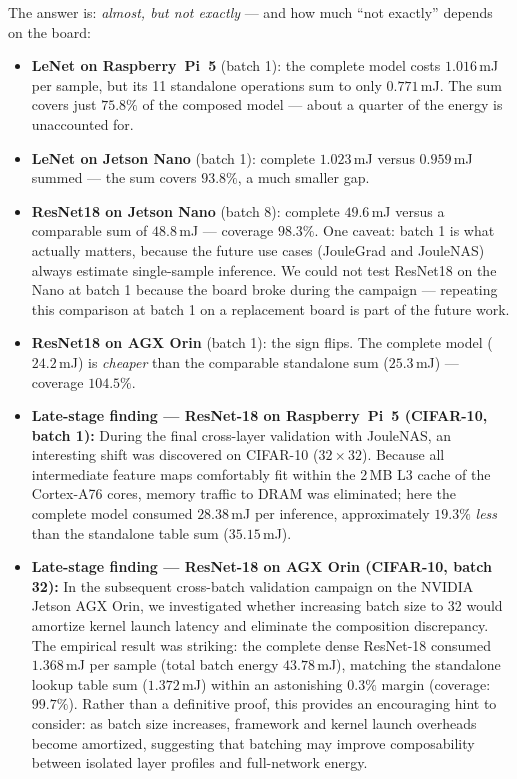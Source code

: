 The answer is: \emph{almost, but not exactly} --- and how much ``not
exactly'' depends on the board:

\begin{itemize}
    \item \textbf{LeNet on Raspberry~Pi~5} (batch 1): the complete model
    costs $1.016$\,mJ per sample, but its 11 standalone operations sum to
    only $0.771$\,mJ. The sum covers just $75.8\%$ of the composed model ---
    about a quarter of the energy is unaccounted for.
    \item \textbf{LeNet on Jetson Nano} (batch 1): complete $1.023$\,mJ
    versus $0.959$\,mJ summed --- the sum covers $93.8\%$, a much smaller
    gap.
    \item \textbf{ResNet18 on Jetson Nano} (batch 8): complete
    $49.6$\,mJ versus a comparable sum of $48.8$\,mJ --- coverage $98.3\%$.
    One caveat: batch 1 is what actually matters, because the future use
    cases (JouleGrad and JouleNAS) always estimate single-sample inference.
    We could not test ResNet18 on the Nano at batch 1 because the board
    broke during the campaign --- repeating this comparison at batch 1 on a
    replacement board is part of the future work.
    \item \textbf{ResNet18 on AGX Orin} (batch 1): the sign flips. The
    complete model ($24.2$\,mJ) is \emph{cheaper} than the comparable
    standalone sum ($25.3$\,mJ) --- coverage $104.5\%$.
    \item \textbf{Late-stage finding --- ResNet-18 on Raspberry~Pi~5 (CIFAR-10, batch 1):} During the final cross-layer validation with JouleNAS, an interesting shift was discovered on CIFAR-10 ($32 \times 32$). Because all intermediate feature maps comfortably fit within the 2\,MB L3 cache of the Cortex-A76 cores, memory traffic to DRAM was eliminated; here the complete model consumed $28.38$\,mJ per inference, approximately $19.3\%$ \emph{less} than the standalone table sum ($35.15$\,mJ).
    \item \textbf{Late-stage finding --- ResNet-18 on AGX Orin (CIFAR-10, batch 32):} In the subsequent cross-batch validation campaign on the NVIDIA Jetson AGX Orin, we investigated whether increasing batch size to 32 would amortize kernel launch latency and eliminate the composition discrepancy. The empirical result was striking: the complete dense ResNet-18 consumed $1.368$\,mJ per sample (total batch energy $43.78$\,mJ), matching the standalone lookup table sum ($1.372$\,mJ) within an astonishing $0.3\%$ margin (coverage: $99.7\%$). Rather than a definitive proof, this provides an encouraging hint to consider: as batch size increases, framework and kernel launch overheads become amortized, suggesting that batching may improve composability between isolated layer profiles and full-network energy.
\end{itemize}

